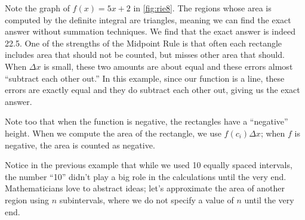 {Note the graph of $f(x) = 5x+2$ in \autoref{fig:rie8}. The regions whose area is computed by the definite integral are triangles, meaning we can find the exact answer without summation techniques. We find that the exact answer is indeed 22.5. One of the strengths of the Midpoint Rule is that often each rectangle includes area that should not be counted, but misses other area that should. When $\Delta x$ is small, these two amounts are about equal and these errors almost ``subtract each other out.'' In this example, since our function is a line, these errors are exactly equal and they do subtract each other out, giving us the exact answer.

Note too that when the function is negative, the rectangles have a ``negative'' height. When we compute the area of the rectangle, we use $f(c_i)\Delta x$; when $f$ is negative, the area is counted as negative.}

Notice in the previous example that while we used 10 equally spaced intervals, the number ``10'' didn't play a big role in the calculations until the very end. Mathematicians love to abstract ideas; let's approximate the area of another region using $n$ subintervals, where we do not specify a value of $n$ until the very end.

